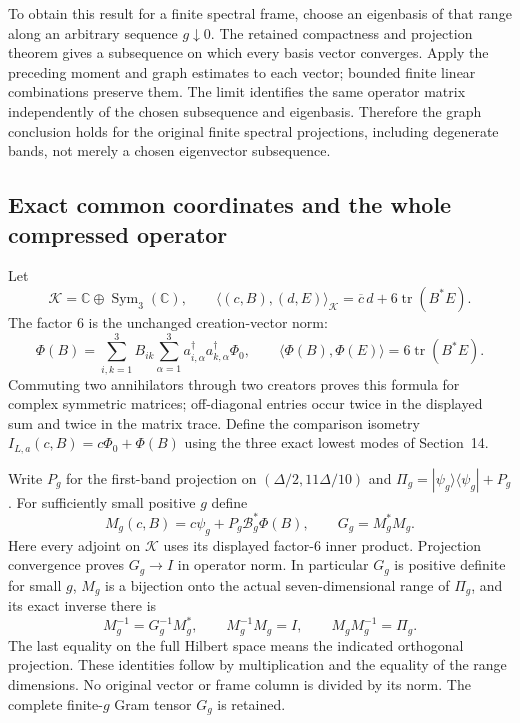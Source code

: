 \documentclass[11pt]{article}
\begin{document}
To obtain this result for a finite spectral frame, choose an eigenbasis
of that range along an arbitrary sequence $g\downarrow0$.
The retained compactness and projection theorem gives a subsequence
on which every basis vector converges. Apply the preceding moment and
graph estimates to each vector; bounded finite linear combinations
preserve them. The limit identifies the same operator matrix
independently of the chosen subsequence and eigenbasis. Therefore the
graph conclusion holds for the original finite spectral projections,
including degenerate bands, not merely a chosen eigenvector subsequence.

\subsection{Exact common coordinates and the whole compressed operator}

Let
\[
 \mathcal K=\mathbb C\oplus\operatorname{Sym}_3(\mathbb C),\qquad
 \langle(c,B),(d,E)\rangle_{\mathcal K}
 =\overline c\,d+6\operatorname{tr}(B^*E).
\]
The factor $6$ is the unchanged creation-vector norm:
\[
 \Phi(B)=\sum_{i,k=1}^3B_{ik}
            \sum_{\alpha=1}^3a_{i,\alpha}^\dagger
                            a_{k,\alpha}^\dagger\Phi_0,
 \qquad \langle\Phi(B),\Phi(E)\rangle=6\operatorname{tr}(B^*E).
\]
Commuting two annihilators through two creators proves this formula
for complex symmetric matrices; off-diagonal entries occur twice in
the displayed sum and twice in the matrix trace. Define the comparison
isometry $I_{L,a}(c,B)=c\Phi_0+\Phi(B)$ using the three exact lowest
modes of Section~14.

Write $P_g$ for the first-band projection on
$(\Delta/2,11\Delta/10)$ and $\Pi_g=|\psi_g\rangle\langle\psi_g|+P_g$.
For sufficiently small positive $g$ define
\begin{equation}\label{eq:local-frame}
 M_g(c,B)=c\psi_g+P_g\mathcal B_g^*\Phi(B),\qquad G_g=M_g^*M_g.
\end{equation}
Here every adjoint on $\mathcal K$ uses its displayed factor-$6$
inner product. Projection convergence proves $G_g\to I$ in
operator norm. In particular $G_g$ is positive definite for small
$g$, $M_g$ is a bijection onto the actual seven-dimensional range
of $\Pi_g$, and its exact inverse there is
\[
 M_g^{-1}=G_g^{-1}M_g^*,\qquad
 M_g^{-1}M_g=I,\qquad M_gM_g^{-1}=\Pi_g.
\]
The last equality on the full Hilbert space means the indicated
orthogonal projection. These identities follow by multiplication and
the equality of the range dimensions. No original vector or frame
column is divided by its norm. The complete finite-$g$ Gram tensor
$G_g$ is retained.
\end{document}
